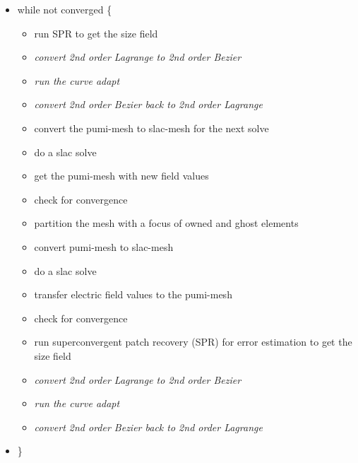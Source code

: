 \documentclass[review,authoryear,12pt]{elsarticle_summary_report}
\begin{document}
\begin{itemize}
  \item[] while not converged \{
   \begin{itemize}
	  \item run SPR to get the size field 
	  \item \textit{convert 2nd order Lagrange to 2nd order Bezier}
	  \item \textit{run the curve adapt}
	  \item \textit{convert 2nd order Bezier back to 2nd order Lagrange}
	  \item convert the pumi-mesh to slac-mesh for the next solve
	  \item do a slac solve
	  \item get the pumi-mesh with new field values
	  \item check for convergence
   \end{itemize}
   \begin{itemize}
          \item partition the mesh with a focus of owned and ghost elements
          \item convert pumi-mesh to slac-mesh
	  \item do a slac solve %
	  \item transfer electric field values to the pumi-mesh
          \item check for convergence
          \item run superconvergent patch recovery (SPR) for error estimation to get the size field 
	  \item \textit{convert 2nd order Lagrange to 2nd order Bezier} %
	  \item \textit{run the curve adapt}
	  \item \textit{convert 2nd order Bezier back to 2nd order Lagrange} %
   \end{itemize}

 \item[] \}
\end{itemize}
\end{document}
